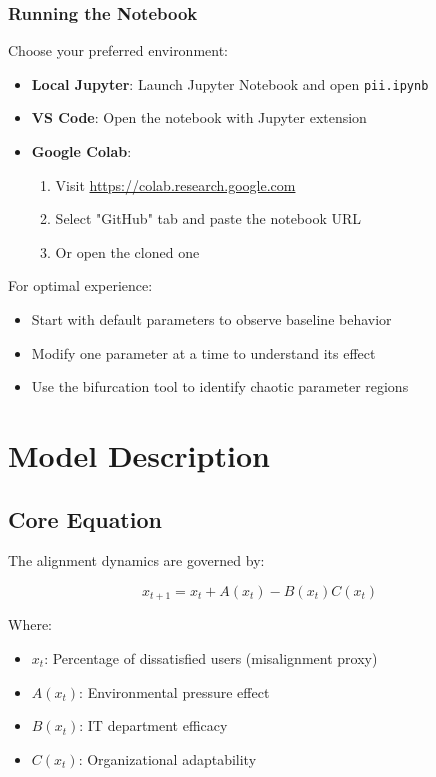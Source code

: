 \documentclass[a4paper, 11pt]{article}
\begin{document}
\subsubsection{Running the Notebook}
Choose your preferred environment:
\begin{itemize}
	\item \textbf{Local Jupyter}: Launch Jupyter Notebook and open \texttt{pii.ipynb}
	\item \textbf{VS Code}: Open the notebook with Jupyter extension
	\item \textbf{Google Colab}:
	      \begin{enumerate}
		      \item Visit \url{https://colab.research.google.com}
		      \item Select "GitHub" tab and paste the notebook URL
		      \item Or open the cloned one
	      \end{enumerate}
\end{itemize}

For optimal experience:
\begin{itemize}
	\item Start with default parameters to observe baseline behavior
	\item Modify one parameter at a time to understand its effect
	\item Use the bifurcation tool to identify chaotic parameter regions
\end{itemize}

\section{Model Description}
\subsection{Core Equation}
The alignment dynamics are governed by:

\begin{equation}
	x_{t + 1} = x_t + A(x_t) - B(x_t)C(x_t)
\end{equation}

Where:
\begin{itemize}
	\item $x_t$: Percentage of dissatisfied users (misalignment proxy)
	\item $A(x_t)$: Environmental pressure effect
	\item $B(x_t)$: IT department efficacy
	\item $C(x_t)$: Organizational adaptability
\end{itemize}
\end{document}

